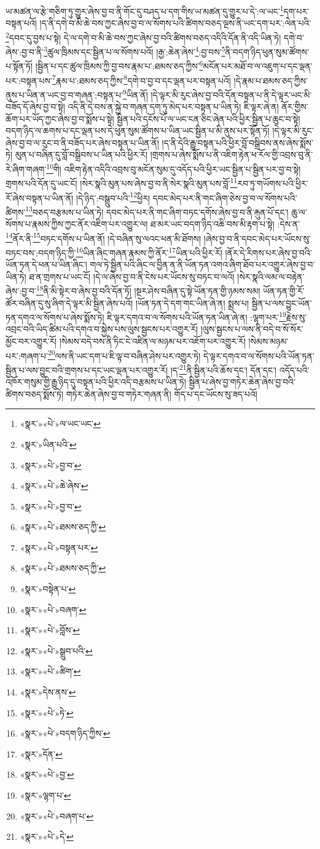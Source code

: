 ཡ་མཚན་ལ་རྩེ་གཅིག་ཏུ་གྱུར་ཞེས་བྱ་བ་ནི་གོང་དུ་བཤད་པ་དག་གིས་ཡ་མཚན་དུ་གྱུར་པ་དེ་:ལ་ཡང་\footnote{«སྣར་»«པེ་»ལ་ཡང་ཡང་}དག་པར་བསྟན་པའོ། །ད་ནི་དགེ་བ་མི་ཆེ་བས་ཀྱང་ཞེས་བྱ་བ་ལ་སོགས་པའི་ཚིགས་བཅད་ལྔས་ནི་ཡང་དག་པར་:ལེན་པའི་\footnote{«སྣར་»ཡིན་པའི་}དབང་དུ་བྱས་པ་སྟེ། དེ་ལ་དགེ་བ་མི་ཆེ་བས་ཀྱང་ཞེས་བྱ་བའི་ཚིགས་བཅད་འདིའི་དོན་ནི་འདི་ཡིན་ཏེ། དགེ་བ་ཞེས་:བྱ་བ་ནི་\footnote{«སྣར་»«པེ་»བྱ་བ་}ཚུལ་ཁྲིམས་དང་སྦྱིན་པ་ལ་སོགས་པའོ། །རྒྱ་:ཆེན་ཞེས་\footnote{«སྣར་»«པེ་»ཆེ་ཞེས་}:བྱ་བས་\footnote{«སྣར་»«པེ་»བྱ་བ་}ནི་བདག་ཉིད་ཕུན་སུམ་ཚོགས་པ་སྟོན་ཏོ། །སྦྱིན་པ་དང་ཚུལ་ཁྲིམས་ཀྱི་བྱ་བས་རྣམ་པ་:ཐམས་ཅད་ཀྱིས་\footnote{«སྣར་»«པེ་»ཐམས་ཅད་ཀྱི་}མངོན་པར་མཐོ་བ་ལ་འཇུག་པ་དང་ལྡན་པར་:བསྟན་པས་\footnote{«སྣར་»«པེ་»བསྟན་པར་}རྣམ་པ་:ཐམས་ཅད་ཀྱིས་\footnote{«སྣར་»«པེ་»ཐམས་ཅད་ཀྱི་}དགེ་བ་བྱ་བ་དང་ལྡན་པར་བསྟན་པའོ། །དེ་རྣམ་པ་ཐམས་ཅད་ཀྱིས་ནུས་པ་ཡིན་ན་ཡང་བྱ་བ་གཞན་:བསྟན་པ་\footnote{«སྣར་»བསྟེན་པ་}ཡིན་ནོ། །དེ་ལྟར་མི་རུང་ཞེས་བྱ་བའི་དོན་བསྟན་པ་ནི་དེ་ལྟར་ཡང་མི་བཟོད་དོ་ཞེས་བྱ་བ་སྟེ། འདི་ནི་དེ་བས་ན་སྐྱེ་བ་གཞན་དག་ཏུ་མེད་པར་བསྟན་པ་ཡིན་ཏེ། ཇི་ལྟར་ཞེ་ན། ནོར་གྱིས་ཆོག་པར་ཡོད་ཀྱང་ཞེས་བྱ་བ་སྨོས་པ་སྟེ། སྦྱིན་པའི་དངོས་པོ་ལ་ཡང་ངན་ཅིང་ཞེན་པའི་ཕྱིར་སྦྱིན་པ་ཆུང་བ་སྟེ། བདག་ཉིད་ལ་ཆགས་པ་དང་ལྡན་པས་དེ་ཕུན་སུམ་ཚོགས་པ་ཡིན་ཡང་སྦྱིན་པ་མི་ནུས་པར་སྟོན་ཏོ། །དེ་ལྟར་མི་རུང་ཞེས་བྱ་བ་ལ་རུང་བ་ནི་བཟོད་པར་ཞེས་བསྟན་པ་ཡིན་ནོ། །ད་ནི་དེའི་རྒྱུ་བསྟན་པའི་ཕྱིར་བློ་བསྒྲིབས་ནས་ཞེས་སྨོས་ཏེ། མུན་པ་བཞིན་དུ་བློ་བསྒྲིབས་པ་ཡིན་པའི་ཕྱིར་རོ། །གྲགས་པ་ཞེས་སྨོས་པ་ནི་འཇིག་རྟེན་ཕ་རོལ་གྱི་འབྲས་བུ་ནི་རེ་ཞིག་གཞག་\footnote{«སྣར་»«པེ་»བཞག་}གི། འཇིག་རྟེན་འདིའི་འབྲས་བུ་མངོན་སུམ་དུ་འདོད་པའི་ཕྱིར་ཡང་སྦྱིན་པ་སྦྱིན་པར་བྱ་བ་སྟེ། གྲགས་པའི་དོན་དུ་ཡང་ངོ། །སེར་སྣའི་མུན་པས་ཞེས་བྱ་བ་ནི་སེར་སྣའི་མུན་པས་བློ་\footnote{«སྣར་»«པེ་»བློས་}རབ་ཏུ་གཡོགས་པའི་ཕྱིར་རོ་ཞེས་བསྟན་པ་ཡིན་ནོ། །དེ་ཉིད་:བསྒྲུབ་པའི་\footnote{«སྣར་»«པེ་»སྒྲུབ་པའི་}ཕྱིར། དབང་མེད་པར་ནི་གང་ཞིག་ཅེས་བྱ་བ་ལ་སོགས་པའི་ཚིགས་\footnote{«སྣར་»«པེ་»ཚིག་}བཅད་བརྩམས་པ་ཡིན་ཏེ། དབང་མེད་པར་ནི་གང་ཞིག་བཏང་དགོས་ཞེས་བྱ་བ་ནི་རྐུན་པོ་དང་། ཆུ་ལ་སོགས་པ་རྣམས་ཀྱིས་ཀྱང་ནོར་འཇིག་པར་འགྱུར་ལ། ཐ་མར་ཡང་བདག་ཉིད་འཆི་བས་མི་རྟག་པ་སྟེ། :དེས་ན་\footnote{«སྣར་»དེས་ནས་}ནོར་ནི་\footnote{«སྣར་»«པེ་»ཏེ་}བཏང་དགོས་པ་ཡིན་ནོ། །དེ་བཞིན་སུ་ལའང་ཕན་མི་ཐོགས། །ཞེས་བྱ་བ་ནི་དབང་མེད་པར་ཡོངས་སུ་བཏང་བས་:བདག་ཉིད་ཀྱི་\footnote{«སྣར་»«པེ་»བདག་ཉིད་ཀྱིས་}ཡིན་ཞིང་གཞན་རྣམས་ཀྱི་ནོར་\footnote{«སྣར་»དོན་}ཡིན་པའི་ཕྱིར་རོ། །ནོར་དེ་རིགས་པར་ཞེས་བྱ་བའི་ཡོན་ཏན་དེ་ཕན་པ་ཡིན་ཞིང་། གལ་ཏེ་སྦྱིན་པའི་ཞིང་ལ་བྱིན་ན་ནི་ཡོན་ཏན་འགའ་ཞིག་ཐོབ་པར་འགྱུར་ཞེས་བྱ་བ་ཡིན་ཏེ། ཐ་ན་གྲགས་པ་ཡང་ངོ། །དེ་ལ་ཞེས་བྱ་བ་ནི་ངེས་པར་ཡོངས་སུ་བཏང་བ་ལའོ། །སེར་སྣའི་ལམ་ལ་བརྟེན་ཞེས་:བྱ་བ་\footnote{«སྣར་»«པེ་»བྱ་}ནི་མི་སྟེར་བ་ཞེས་བྱ་བའི་དོན་ཏོ། །སྔར་ཤེས་བཞིན་དུ་སྟེ་ཡོན་ཏན་གྱི་ཉམས་སམ། ཡོན་ཏན་གྱི་རོ་ཚོར་བཞིན་དུ་སུ་ཞིག་དེ་ལྟར་མི་སྦྱིན་ཞེས་པའོ། །ཡོན་ཏན་དེ་དག་གང་ཡིན་ཞེ་ན། སྨྲས་པ། སྦྱིན་པ་ལས་བྱུང་ཡོན་ཏན་དགའ་ལ་སོགས་པ་ཞེས་སྨོས་ཏེ། ཇི་ལྟར་དགའ་བ་ལ་སོགས་པའི་ཡོན་ཏན་ཡིན་ཞེ་ན། :ལྷག་པར་\footnote{«སྣར་»ལྷག་པ་}རྗེས་སུ་འབྲང་བའི་ཡིད་ཚིམ་པའི་དགའ་བ་སྐྱེས་པས་ལུས་སྦྱངས་པར་འགྱུར་རོ། །ལུས་སྦྱངས་པ་ལས་ནི་བདེ་བ་སོ་སོར་མྱོང་བར་འགྱུར་རོ། །སེམས་བདེ་བས་ནི་ཏིང་ངེ་འཛིན་ལ་མཉམ་པར་འཇོག་པར་འགྱུར་རོ། །སེམས་མཉམ་པར་:གཞག་པ་\footnote{«སྣར་»«པེ་»བཞག་པ་}ལས་ནི་ཡང་དག་པ་ཇི་ལྟ་བ་བཞིན་ཤེས་པར་འགྱུར་ཏེ། དེ་ལྟར་དགའ་བ་ལ་སོགས་པའི་ཡོན་ཏན་སྦྱིན་པ་ལས་བྱུང་བའི་གྲགས་པ་དང་ཡང་ལྡན་པར་འགྱུར་རོ། །ད་\footnote{«སྣར་»«པེ་»དེ་}ནི་སྦྱིན་པའི་ཆོས་དང་། དོན་དང་། འདོད་པའི་འཁོར་གསུམ་གྱི་རྒྱུ་ཉིད་དུ་བསྟན་པའི་ཕྱིར་འདི་བརྩམས་པ་ཡིན་ཏེ། སྦྱིན་པ་ཞེས་བྱ་གཏེར་ཆེན་ཞེས་བྱ་བའི་ཚིགས་བཅད་སྨོས་ཏེ། གཏེར་ཆེན་ཞེས་བྱ་བ་གཏེར་གཞན་ནི། གོད་པ་དང་ཡོངས་སུ་ཟད་པའོ། 
